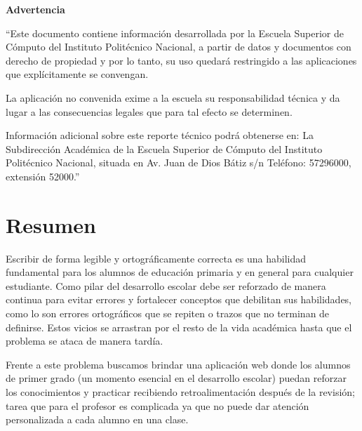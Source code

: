\documentclass[12pt]{article}
\begin{document}

\newpage
\vspace*{4cm}

\begin{tcolorbox}[colframe=blue!80!black, colback=white, boxrule=1.5pt, arc=0pt, left=15pt, right=15pt, top=15pt, bottom=15pt]
\begin{center}
    \Large\bfseries Advertencia
\end{center}
\vspace{0.5cm}

``Este documento contiene información desarrollada por la Escuela Superior de Cómputo del Instituto Politécnico Nacional, a partir de datos y documentos con derecho de propiedad y por lo tanto, su uso quedará restringido a las aplicaciones que explícitamente se convengan.

La aplicación no convenida exime a la escuela su responsabilidad técnica y da lugar a las consecuencias legales que para tal efecto se determinen.

Información adicional sobre este reporte técnico podrá obtenerse en: La Subdirección Académica de la Escuela Superior de Cómputo del Instituto Politécnico Nacional, situada en Av. Juan de Dios Bátiz s/n Teléfono: 57296000, extensión 52000.''
\end{tcolorbox}
\newpage

\newpage
\vspace*{1cm}
\section*{Resumen}

Escribir de forma legible y ortográficamente correcta es una habilidad fundamental para los alumnos
de educación primaria y en general para cualquier estudiante. Como pilar del desarrollo escolar debe
ser reforzado de manera continua para evitar errores y fortalecer conceptos que debilitan sus
habilidades, como lo son errores ortográficos que se repiten o trazos que no terminan de definirse.
Estos vicios se arrastran por el resto de la vida académica hasta que el problema se ataca de manera
tardía.

Frente a este problema buscamos brindar una aplicación web donde los alumnos de primer
grado (un momento esencial en el desarrollo escolar) puedan reforzar los conocimientos y practicar
recibiendo retroalimentación después de la revisión; tarea que para el profesor es complicada ya que
no puede dar atención personalizada a cada alumno en una clase.
\end{document}

